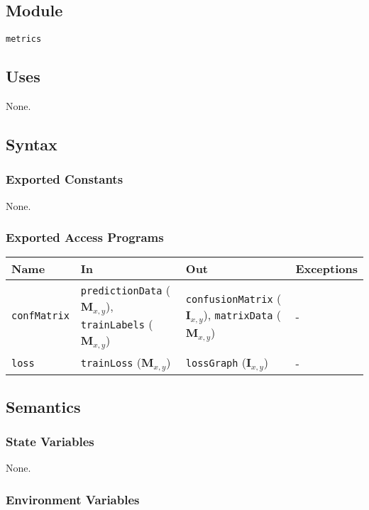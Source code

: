 \documentclass[12pt, titlepage]{article}
\def\code#1{\texttt{#1}}
\begin{document}
\subsection{Module}

\code{metrics}

\subsection{Uses}

None.

\subsection{Syntax}

\subsubsection{Exported Constants}

None.

\subsubsection{Exported Access Programs}

\begin{center}
\begin{tabular}{p{3cm} p{4cm} p{4cm} p{1cm}}
\hline
\textbf{Name} & \textbf{In} & \textbf{Out} & \textbf{Exceptions} \\
\hline
\code{confMatrix} & \code{predictionData} ($\mathbf{M}_{x,y}$), \code{trainLabels} ($\mathbf{M}_{x,y}$) & \code{confusionMatrix} ($\mathbf{I}_{x,y}$), \code{matrixData} ($\mathbf{M}_{x,y}$)  & - \\
\code{loss} & \code{trainLoss} ($\mathbf{M}_{x,y}$) & \code{lossGraph} ($\mathbf{I}_{x,y}$)  & - \\
\hline
\end{tabular}
\end{center}

\subsection{Semantics}

\subsubsection{State Variables}

None.

\subsubsection{Environment Variables}
\end{document}
